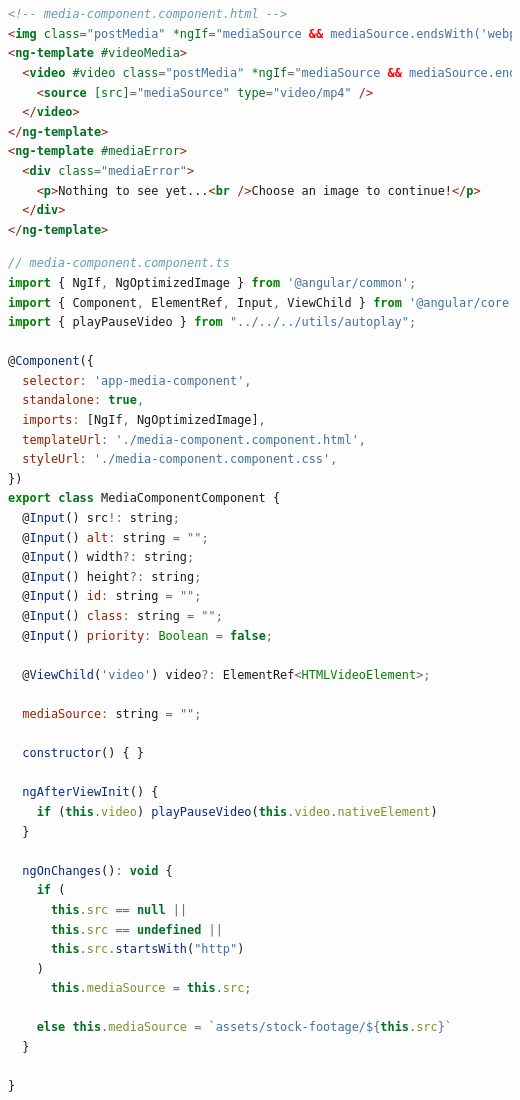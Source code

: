 \documentclass[a4paper, 10pt]{article}
\makeatletter
\renewcommand\lstlistoflistings{
  \section{\lstlistlistingname}
  \@starttoc{lol}%
}
\makeatother
\begin{document}
\pagebreak

\appendix

\lstlistoflistings

\begin{lstlisting}[caption=MediaComponent in Angular (Template), label={lst:Angular:MediaComponent:Template}, language=HTML]
<!-- media-component.component.html -->
<img class="postMedia" *ngIf="mediaSource && mediaSource.endsWith('webp'); else videoMedia" [ngSrc]="mediaSource" [alt]="alt" [width]="width?.endsWith('%') ? 600 : width" [height]="height || (width?.endsWith('%') ? 600 : width)" [id]="id" [class]="class" [sizes]="width!" [priority]="priority" />
<ng-template #videoMedia>
  <video #video class="postMedia" *ngIf="mediaSource && mediaSource.endsWith('mp4'); else mediaError" [attr.width]="width" controls controlslist="nodownload,nofullscreen,noremoteplayback" disablepictureinpicture loop [muted]="true" preload="metadata" >
    <source [src]="mediaSource" type="video/mp4" />
  </video>
</ng-template>
<ng-template #mediaError>
  <div class="mediaError">
    <p>Nothing to see yet...<br />Choose an image to continue!</p>
  </div>
</ng-template>
\end{lstlisting}

\begin{lstlisting}[caption=MediaComponent in Angular (Module), label={lst:Angular:MediaComponent:Module}, language=JavaScript]
// media-component.component.ts
import { NgIf, NgOptimizedImage } from '@angular/common';
import { Component, ElementRef, Input, ViewChild } from '@angular/core';
import { playPauseVideo } from "../../../utils/autoplay";

@Component({
  selector: 'app-media-component',
  standalone: true,
  imports: [NgIf, NgOptimizedImage],
  templateUrl: './media-component.component.html',
  styleUrl: './media-component.component.css',
})
export class MediaComponentComponent {
  @Input() src!: string;
  @Input() alt: string = "";
  @Input() width?: string;
  @Input() height?: string;
  @Input() id: string = "";
  @Input() class: string = "";
  @Input() priority: Boolean = false;

  @ViewChild('video') video?: ElementRef<HTMLVideoElement>;

  mediaSource: string = "";

  constructor() { }

  ngAfterViewInit() {
    if (this.video) playPauseVideo(this.video.nativeElement)
  }

  ngOnChanges(): void {
    if (
      this.src == null ||
      this.src == undefined ||
      this.src.startsWith("http")
    )
      this.mediaSource = this.src;

    else this.mediaSource = `assets/stock-footage/${this.src}`
  }

}
\end{lstlisting}
\end{document}

